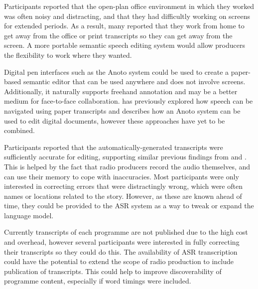 Participants reported that the open-plan office environment in which they worked was often noisy and distracting, and
that they had difficultly working on screens for extended periods. As a result, many reported that they work from home
to get away from the office or print transcripts so they can get away from the screen. A more portable semantic speech
editing system would allow producers the flexibility to work where they wanted.

Digital pen interfaces such as the Anoto system could be used to create a paper-based semantic editor that can be used
anywhere and does not involve screens. Additionally, it naturally supports freehand annotation and may be a better
medium for face-to-face collaboration.  \citet{Klemmer2003} has previously explored how speech can be navigated using
paper transcripts and \citet{Weibel2008} describes how an Anoto system can be used to edit digital documents, however
these approaches have yet to be combined.

Participants reported that the automatically-generated transcripts were sufficiently accurate for editing, supporting
similar previous findings from \citet{Whittaker2004} and \citet{Sivaraman2016}. This is helped by the fact that radio
producers record the audio themselves, and can use their memory to cope with inaccuracies. Most participants were only
interested in correcting errors that were distractingly wrong, which were often names or locations related to the
story. However, as these are known ahead of time, they could be provided to the ASR system as a way to tweak
or expand the language model.

Currently transcripts of each programme are not published due to the high cost and
overhead, however several participants were interested in fully correcting their transcripts so they could do this.
The availability of ASR transcription could have the potential to extend the scope of radio production to include
publication of transcripts. This could help to improve discoverability of programme content, especially if word timings
were included.



